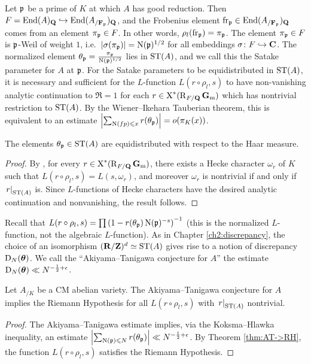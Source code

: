 Let $\mathfrak{p}$ be a prime of $K$ at which $A$ has good reduction. Then 
$F = \operatorname{End}(A)_{\mathbf{Q}}\hookrightarrow \operatorname{End}(A_{/\mathbf{F}_{\mathfrak{p}}})_{\mathbf{Q}}$, and the Frobenius 
element $\mathrm{fr}_{\mathfrak{p}}\in \operatorname{End}(A_{/\mathbf{F}_{\mathfrak{p}}})_{\mathbf{Q}}$ comes from an element 
$\pi_{\mathfrak{p}}\in F$. In other words, $\rho_l(\mathrm{fr}_{\mathfrak{p}}) = \pi_{\mathfrak{p}}$. The element 
$\pi_{\mathfrak{p}}\in F$ is $\mathfrak{p}$-Weil of weight $1$, 
i.e.~$|\sigma(\pi_{\mathfrak{p}})| = \operatorname{N}(\mathfrak{p})^{1/2}$ for all embeddings 
$\sigma\colon F\hookrightarrow \mathbf{C}$. The normalized element 
$\theta_{\mathfrak{p}} = \frac{\pi_{\mathfrak{p}}}{\operatorname{N}(\mathfrak{p})^{1/2}}$ lies in $\mathrm{ST}(A)$, and we call this 
the Satake parameter for $A$ at $\mathfrak{p}$. For the Satake parameters to be 
equidistributed in $\mathrm{ST}(A)$, it is necessary and sufficient for the 
$L$-function $L(r\circ \rho_l,s)$ to have non-vanishing analytic continuation 
to $\Re =1$ for each $r\in \operatorname{X}^\ast(\operatorname{R}_{F/\mathbf{Q}}\mathbf{G}_\mathrm{m})$ which has nontrivial 
restriction to $\mathrm{ST}(A)$. By the Wiener--Ikehara Tauberian theorem, this is 
equivalent to an estimate 
$\left| \sum_{\operatorname{N}(fp)\leqslant x} r(\theta_{\mathfrak{p}})\right| = o(\pi_K(x))$. 

\begin{theorem}
The elements $\theta_{\mathfrak{p}}\in \mathrm{ST}(A)$ are equidistributed with respect to the 
Haar measure. 
\end{theorem}
\begin{proof}
By \cite[Th.~10, 11]{serre-tate-1968}, for every 
$r\in \operatorname{X}^\ast(\operatorname{R}_{F/\mathbf{Q}}\mathbf{G}_\mathrm{m})$, there exists a Hecke character $\omega_r$ of $K$ 
such that $L(r\circ \rho_l,s) = L(s,\omega_r)$, and moreover $\omega_r$ is 
nontrivial if and only if $\left.r\right|_{\mathrm{ST}(A)}$ is. Since $L$-functions of 
Hecke characters have the desired analytic continuation and nonvanishing, the 
result follows. 
\end{proof}

Recall that 
$L(r\circ \rho_l,s) = \prod \left(1 - r(\theta_{\mathfrak{p}}) \operatorname{N}(\mathfrak{p})^{-s}\right)^{-1}$ 
(this is the normalized $L$-function, not the algebraic $L$-function). 
As in Chapter \ref{ch2:discrepancy}, the choice of an isomorphism
$(\mathbf{R}/\mathbf{Z})^d\simeq \mathrm{ST}(A)$ gives rise to a notion of discrepancy 
$\operatorname{D}_N({\boldsymbol\theta})$. We call the ``Akiyama--Tanigawa conjecture for $A$'' the 
estimate $\operatorname{D}_N({\boldsymbol\theta}) \ll N^{-\frac 1 2+\epsilon}$. 

\begin{theorem}
Let $A_{/K}$ be a CM abelian variety. The Akiyama--Tanigawa conjecture for $A$ 
implies the Riemann Hypothesis for all $L(r\circ \rho_l,s)$ with 
$\left. r\right|_{\mathrm{ST}(A)}$ nontrivial. 
\end{theorem}
\begin{proof}
The Akiyama--Tanigawa estimate implies, via the Koksma--Hlawka inequality, an 
estimate 
$\left| \sum_{\operatorname{N}(\mathfrak{p})\leqslant N} r(\theta_{\mathfrak{p}})\right| \ll N^{-\frac 1 2+\epsilon}$. 
By Theorem \ref{thm:AT->RH}, the function $L(r\circ \rho_l,s)$ satisfies the 
Riemann Hypothesis. 
\end{proof}

